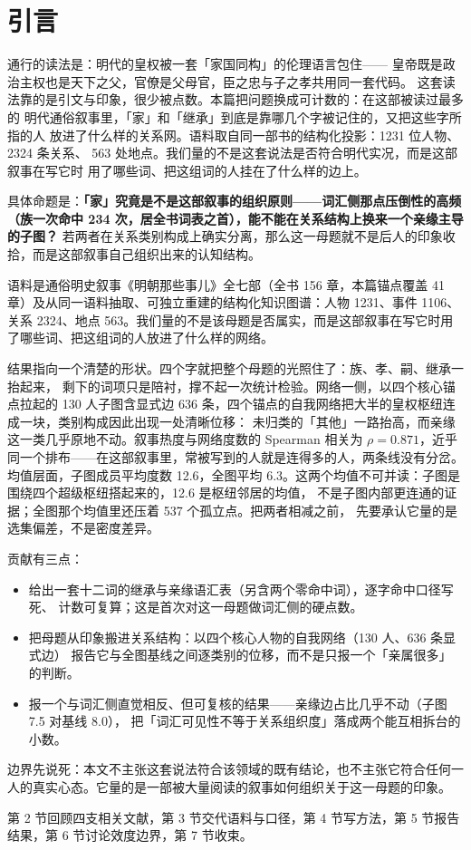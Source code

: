 \section{引言}

通行的读法是：明代的皇权被一套「家国同构」的伦理语言包住——
皇帝既是政治主权也是天下之父，官僚是父母官，臣之忠与子之孝共用同一套代码。
这套读法靠的是引文与印象，很少被点数。本篇把问题换成可计数的：在这部被读过最多的
明代通俗叙事里，「家」和「继承」到底是靠哪几个字被记住的，又把这些字所指的人
放进了什么样的关系网。语料取自同一部书的结构化投影：1231 位人物、2324 条关系、
563 处地点。我们量的不是这套说法是否符合明代实况，而是这部叙事在写它时
用了哪些词、把这组词的人挂在了什么样的边上。

具体命题是：\textbf{「家」究竟是不是这部叙事的组织原则——词汇侧那点压倒性的高频
（族一次命中 234 次，居全书词表之首），能不能在关系结构上换来一个亲缘主导的子图？} 若两者在关系类别构成上确实分离，那么这一母题就不是后人的印象收拾，而是这部叙事自己组织出来的认知结构。

语料是通俗明史叙事《明朝那些事儿》全七部（全书 156 章，本篇锚点覆盖 41 章）及从同一语料抽取、可独立重建的结构化知识图谱：人物 1231、事件 1106、关系 2324、地点 563。我们量的不是该母题是否属实，而是这部叙事在写它时用了哪些词、把这组词的人放进了什么样的网络。

结果指向一个清楚的形状。四个字就把整个母题的光照住了：族、孝、嗣、继承一抬起来，
剩下的词项只是陪衬，撑不起一次统计检验。网络一侧，以四个核心锚点拉起的 130 人子图含显式边 636 条，四个锚点的自我网络把大半的皇权枢纽连成一块，类别构成因此出现一处清晰位移：
未归类的「其他」一路抬高，而亲缘这一类几乎原地不动。叙事热度与网络度数的 Spearman 相关为 $\rho=0.871$，近乎同一个排布——在这部叙事里，常被写到的人就是连得多的人，两条线没有分岔。均值层面，子图成员平均度数 12.6，全图平均 6.3。这两个均值不可并读：子图是围绕四个超级枢纽搭起来的，12.6 是枢纽邻居的均值，
不是子图内部更连通的证据；全图那个均值里还压着 537 个孤立点。把两者相减之前，
先要承认它量的是选集偏差，不是密度差异。

贡献有三点：
\begin{itemize}
\item 给出一套十二词的继承与亲缘语汇表（另含两个零命中词），逐字命中口径写死、
计数可复算；这是首次对这一母题做词汇侧的硬点数。
\item 把母题从印象搬进关系结构：以四个核心人物的自我网络（130 人、636 条显式边）
报告它与全图基线之间逐类别的位移，而不是只报一个「亲属很多」的判断。
\item 报一个与词汇侧直觉相反、但可复核的结果——亲缘边占比几乎不动（子图 7.5 对基线 8.0），
把「词汇可见性不等于关系组织度」落成两个能互相拆台的小数。
\end{itemize}

边界先说死：本文不主张这套说法符合该领域的既有结论，也不主张它符合任何一人的真实心态。它量的是一部被大量阅读的叙事如何组织关于这一母题的印象。

第 2 节回顾四支相关文献，第 3 节交代语料与口径，第 4 节写方法，第 5 节报告结果，第 6 节讨论效度边界，第 7 节收束。
